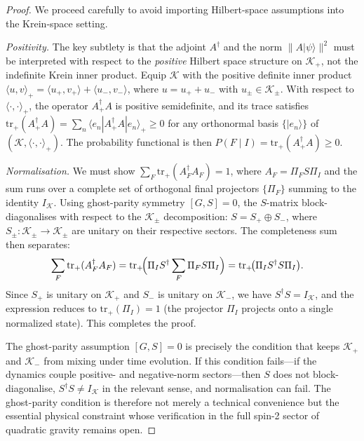 \documentclass[12pt,a4paper]{article}
\theoremstyle{remark}
\begin{document}
\begin{proof}
We proceed carefully to avoid importing Hilbert-space assumptions into the
Krein-space setting.

\textit{Positivity.} The key subtlety is that the adjoint $A^\dagger$ and
the norm $\|A|\psi\rangle\|^2$ must be interpreted with respect to the
\emph{positive} Hilbert space structure on $\mathcal{K}_+$, not the
indefinite Krein inner product. Equip $\mathcal{K}$ with the positive
definite inner product $\langle u, v\rangle_+ = \langle u_+, v_+\rangle +
\langle u_-, v_-\rangle$, where $u = u_+ + u_-$ with $u_\pm \in \mathcal{K}_\pm$.
With respect to $\langle\cdot,\cdot\rangle_+$, the operator $A^\dagger_+ A$
is positive semidefinite, and its trace satisfies
$\mathrm{tr}_+(A^\dagger_+ A) = \sum_n \langle e_n | A^\dagger_+ A | e_n\rangle_+ \geq 0$
for any orthonormal basis $\{|e_n\rangle\}$ of $(\mathcal{K}, \langle\cdot,\cdot\rangle_+)$.
The probability functional is then $P(F\mid I) = \mathrm{tr}_+(A^\dagger_+ A) \geq 0$.

\textit{Normalisation.} We must show $\sum_F \mathrm{tr}_+(A_F^\dagger A_F) = 1$,
where $A_F = \Pi_F S \Pi_I$ and the sum runs over a complete set of
orthogonal final projectors $\{\Pi_F\}$ summing to the identity $I_{\mathcal{K}}$.
Using ghost-parity symmetry $[G, S] = 0$, the $S$-matrix block-diagonalises
with respect to the $\mathcal{K}_\pm$ decomposition:
$S = S_+ \oplus S_-$, where $S_\pm : \mathcal{K}_\pm \to \mathcal{K}_\pm$ are
unitary on their respective sectors. The completeness sum then separates:
\begin{align*}
  \sum_F \mathrm{tr}_+(A_F^\dagger A_F)
  &= \mathrm{tr}_+\!\Bigl(\Pi_I S^\dagger \sum_F \Pi_F S \Pi_I\Bigr)
   = \mathrm{tr}_+\!\bigl(\Pi_I S^\dagger S \Pi_I\bigr).
\end{align*}
Since $S_+$ is unitary on $\mathcal{K}_+$ and $S_-$ is unitary on $\mathcal{K}_-$,
we have $S^\dagger S = I_{\mathcal{K}}$, and the expression reduces to
$\mathrm{tr}_+(\Pi_I) = 1$ (the projector $\Pi_I$ projects onto a single
normalized state). This completes the proof.

The ghost-parity assumption $[G,S] = 0$ is precisely the condition that
keeps $\mathcal{K}_+$ and $\mathcal{K}_-$ from mixing under time evolution.
If this condition fails---if the dynamics couple positive- and negative-norm
sectors---then $S$ does not block-diagonalise, $S^\dagger S \neq I_\mathcal{K}$
in the relevant sense, and normalisation can fail. The ghost-parity
condition is therefore not merely a technical convenience but the essential
physical constraint whose verification in the full spin-2 sector of
quadratic gravity remains open.
\end{proof}
\end{document}
